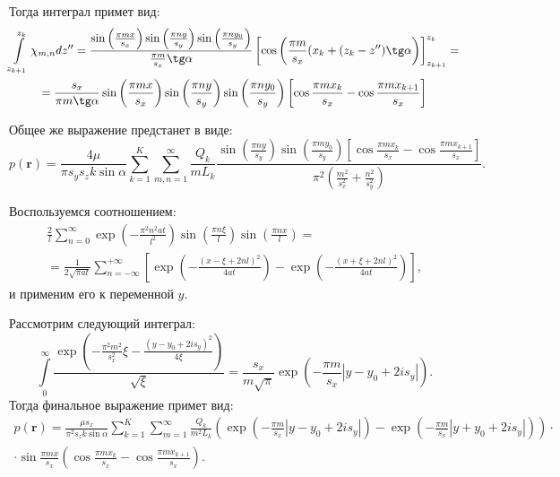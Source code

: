 \documentclass[a4paper,12pt]{article}
\begin{document}
	Тогда интеграл примет вид:
\begin{multline}
	\label{eqn2}
	\int\limits_{z_{k+1}}^{z_{k}}\chi_{m,n}dz'' = \frac{\sin\left({\frac{\pi m x}{s_x}}\right)\sin\left({\frac{\pi n y}{s_y}}\right)\sin\left({\frac{\pi n y_0}{s_y}}\right)}{\frac{\pi m}{s_x}\tg\alpha}
	\left[\cos\left(\frac{\pi m}{s_x}(x_k + (z_k-z'')\tg\alpha\right)\right]_{z_{k+1}}^{z_k} = \nonumber\\
	=\frac{s_x}{\pi m \tg \alpha}\sin\left({\frac{\pi m x}{s_x}}\right)\sin\left({\frac{\pi n y}{s_y}}\right)\sin\left({\frac{\pi n y_0}{s_y}}\right)
	\left[\cos\frac{\pi m x_k}{s_x} - \cos\frac{\pi m x_{k+1}}{s_x}\right]
\end{multline}
	
	Общее же выражение предстанет в виде:
\begin{equation}
	\label{eqn3}
	p(\boldsymbol{r}) = \frac{4\mu}{\pi s_y s_z k \sin{\alpha}}
	\sum\limits_{k=1}^K\sum\limits_{m, n = 1}^{\infty}
	\frac{Q_k}{mL_k}\frac{\sin\left(\frac{\pi n y}{s_y}\right) \sin\left(\frac{\pi m y_0}{s_y}\right)\left[\cos\frac{\pi m x_k}{s_x} - \cos\frac{\pi m x_{k+1}}{s_x}\right]}
	{\pi^2\left(\displaystyle\frac{m^2}{s_x^2} + \frac{n^2}{s_y^2}\right)}.
\end{equation}
	
	Воспользуемся соотношением:
\begin{multline}
	\label{statement}
	\frac{2}{l}\sum\limits_{n=0}^{\infty} \exp\left(-\frac{\pi^2 n^2 a t}{l^2}\right)\sin\left(\frac{\pi n \xi}{l}\right)\sin\left(\frac{\pi n x}{l}\right) =\\
	=\frac{1}{2\sqrt{\pi a t}}\sum\limits_{n = -\infty}^{+\infty}\left[\exp\left(-\frac{(x-\xi+2nl)^2}{4at}\right)-\exp\left(-\frac{(x+\xi+2nl)^2}{4at}\right)\right],
\end{multline}
	и применим его к переменной $y$.
	
	Рассмотрим следующий интеграл:
\begin{equation}
	\label{eqn4}
	\int\limits_0^{\infty}\frac{\exp(-\frac{\pi^2m^2}{s_x^2}\xi - \frac{(y-y_0+2i s_y)^2}{4\xi})}{\sqrt{\xi}} = \frac{s_x}{m\sqrt{\pi}}\exp\left(-\frac{\pi m}{s_x}|y-y_0+2i s_y|\right).
\end{equation}	
	Тогда финальное выражение примет вид:
\begin{multline}
	\label{eqn5}
	p(\boldsymbol{r}) = \frac{\mu s_x}{\pi^2 s_z k\sin{\alpha}}
	\sum\limits_{k=1}^K\sum\limits_{m = 1}^{\infty}\frac{Q_k}{m^2 L_k}
	\left(\exp\left(-\frac{\pi m}{s_x}|y-y_0+2is_y|\right)-\exp\left(-\frac{\pi m}{s_x}|y+y_0+2is_y|\right)\right)\cdot\\
	\cdot \sin\frac{\pi m x}{s_x}\left(\cos\frac{\pi m x_k}{s_x} - \cos\frac{\pi m x_{k+1}}{s_x}\right).
\end{multline}
	
\end{document}
